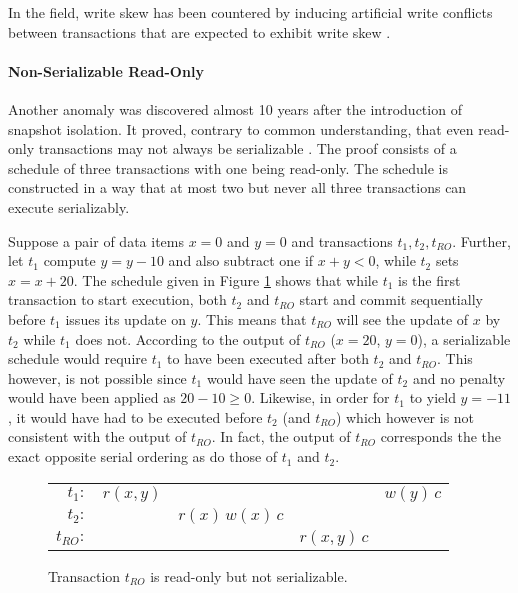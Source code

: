 In the field, write skew has been countered by inducing artificial write
conflicts between transactions that are expected to exhibit write skew
\cite{fekete2005making}.

\paragraph{Non-Serializable Read-Only}

Another anomaly was discovered almost 10 years after the introduction of
snapshot isolation. It proved, contrary to common understanding, that even
read-only transactions may not always be serializable \cite{fekete2004read}. The
proof consists of a schedule of three transactions with one being read-only. The
schedule is constructed in a way that at most two but never all three
transactions can execute serializably.

Suppose a pair of data items $x = 0$ and $y = 0$ and transactions $t_1, t_2,
t_{RO}$. Further, let $t_1$ compute $y = y - 10$ and also subtract one if $x + y <
0$, while $t_2$ sets $x = x + 20$. The schedule given in Figure
\ref{fig:bad_read_only} shows that while $t_1$ is the first transaction to start
execution, both $t_2$ and $t_{RO}$ start and commit sequentially before $t_1$
issues its update on $y$. This means that $t_{RO}$ will see the update of $x$ by
$t_2$ while $t_1$ does not. According to the output of $t_{RO}$ ($x = 20$, $y =
0$), a serializable schedule would require $t_1$ to have been executed after
both $t_2$ and $t_{RO}$. This however, is not possible since $t_1$ would have
seen the update of $t_2$ and no penalty would have been applied as $20 - 10 \geq
0$. Likewise, in order for $t_1$ to yield $y = -11$, it would have had to be
executed before $t_2$ (and $t_{RO}$) which however is not consistent with the
output of $t_{RO}$. In fact, the output of $t_{RO}$ corresponds the the exact
opposite serial ordering as do those of $t_1$ and $t_2$.

\begin{figure}[h!]
    \centering
    \begin{tabular}{r c c c c}
    $t_1:$    & $r(x,y)$ &                   &              & $w(y)\, c$ \\
    $t_2:$    &          & $r(x)\, w(x)\, c$ &              &            \\
    $t_{RO}:$ &          &                   & $r(x,y)\, c$ &
    \end{tabular}
    \caption{Transaction $t_{RO}$ is read-only but not serializable.}
    \label{fig:bad_read_only}
\end{figure}

